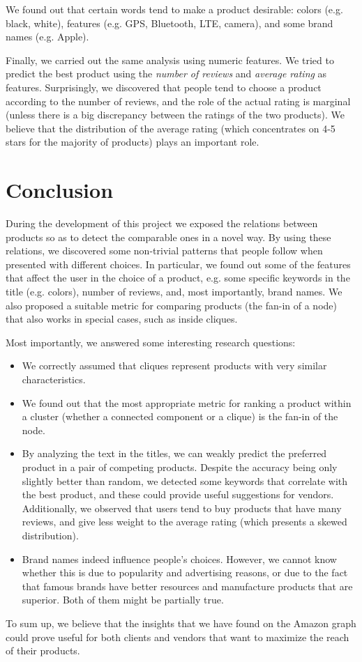 \documentclass[11pt]{article}
\begin{document}
We found out that certain words tend to make a product desirable: colors (e.g. black, white), features (e.g. GPS, Bluetooth, LTE, camera), and some brand names (e.g. Apple).

Finally, we carried out the same analysis using numeric features. We tried to predict the best product using the \emph{number of reviews} and \emph{average rating} as features. Surprisingly, we discovered that people tend to choose a product according to the number of reviews, and the role of the actual rating is marginal (unless there is a big discrepancy between the ratings of the two products). We believe that the distribution of the average rating (which concentrates on 4-5 stars for the majority of products) plays an important role.

\section{Conclusion}
\label{sec:conclusion}

During the development of this project we exposed the relations between products so as to detect the comparable ones in a novel way. By using these relations, we discovered some non-trivial patterns that people follow when presented with different choices. In particular, we found out some of the features that affect the user in the choice of a product, e.g. some specific keywords in the title (e.g. colors), number of reviews, and, most importantly, brand names. We also proposed a suitable metric for comparing products (the fan-in of a node) that also works in special cases, such as inside cliques.

Most importantly, we answered some interesting research questions:
\begin{itemize}
	\item We correctly assumed that cliques represent products with very similar characteristics.
	\item We found out that the most appropriate metric for ranking a product within a cluster (whether a connected component or a clique) is the fan-in of the node.
	\item By analyzing the text in the titles, we can weakly predict the preferred product in a pair of competing products. Despite the accuracy being only slightly better than random, we detected some keywords that correlate with the best product, and these could provide useful suggestions for vendors. Additionally, we observed that users tend to buy products that have many reviews, and give less weight to the average rating (which presents a skewed distribution).
	\item Brand names indeed influence people's choices. However, we cannot know whether this is due to popularity and advertising reasons, or due to the fact that famous brands have better resources and manufacture products that are superior. Both of them might be partially true.
\end{itemize}
To sum up, we believe that the insights that we have found on the Amazon graph could prove useful for both clients and vendors that want to maximize the reach of their products.
\end{document}
